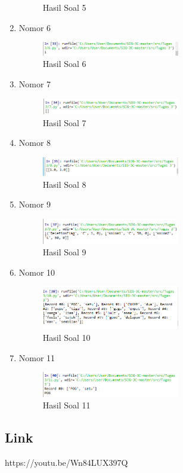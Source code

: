 \begin{enumerate}
\begin{figure}[H]
		\centering
		\caption{Hasil Soal 5}
	\end{figure}
	\item Nomor 6
	
	\begin{figure}[H]
		\includegraphics[width=6cm]{figures/Tugas3/1174091/6.png}
		\centering
		\caption{Hasil Soal 6}
	\end{figure}
	\item Nomor 7
	
	\begin{figure}[H]
		\includegraphics[width=6cm]{figures/Tugas3/1174091/7.png}
		\centering
		\caption{Hasil Soal 7}
	\end{figure}
	\item Nomor 8
	
	\begin{figure}[H]
		\includegraphics[width=6cm]{figures/Tugas3/1174091/8.png}
		\centering
		\caption{Hasil Soal 8}
	\end{figure}
	\item Nomor 9
	
	\begin{figure}[H]
		\includegraphics[width=6cm]{figures/Tugas3/1174091/9.png}
		\centering
		\caption{Hasil Soal 9}
	\end{figure}
	\item Nomor 10
	
	\begin{figure}[H]
		\includegraphics[width=6cm]{figures/Tugas3/1174091/10.png}
		\centering
		\caption{Hasil Soal 10 }
	\end{figure}
	\item Nomor 11
	
	\begin{figure}[H]
		\includegraphics[width=6cm]{figures/Tugas3/1174091/11.png}
		\centering
		\caption{Hasil Soal 11}
	\end{figure}
\end{enumerate}
\subsection{Link}
https://youtu.be/Wn84LUX397Q